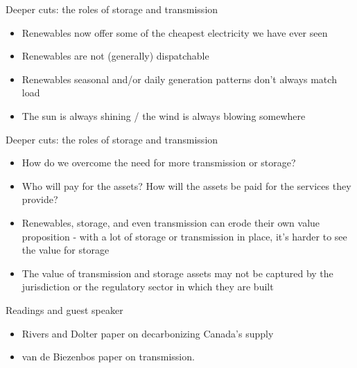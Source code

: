 \documentclass{beamer}
\renewcommand{\(}{\begin{columns}}
\renewcommand{\)}{\end{columns}}
\newcommand{\<}[1]{\begin{column}{#1}}
\renewcommand{\>}{\end{column}}
\begin{document}
\begin{frame}{Deeper cuts: the roles of storage and transmission}
\begin{itemize}
\setlength\itemsep{2em}
\item Renewables now offer some of the cheapest electricity we have ever seen
\item Renewables are not (generally) dispatchable
\item Renewables seasonal and/or daily generation patterns don't always match load
\item The sun is always shining / the wind is always blowing somewhere
\end{itemize}

\vfill \end{frame}



\begin{frame}{Deeper cuts: the roles of storage and transmission}
\begin{itemize}
\setlength\itemsep{2em}
\item How do we overcome the need for more transmission or storage?
\item Who will pay for the assets? How will the assets be paid for the services they provide?
\item Renewables, storage, and even transmission can erode their own value proposition - with a lot of storage or transmission in place, it's harder to see the value for storage
\item The value of transmission and storage assets may not be captured by the jurisdiction or the regulatory sector in which they are built

\end{itemize}

\vfill \end{frame}



\begin{frame}{Readings and guest speaker}
\begin{itemize}
\setlength\itemsep{2em}
\item Rivers and Dolter paper on decarbonizing Canada's supply
\item van de Biezenbos paper on transmission.

\end{itemize}

\vfill \end{frame}
\end{document}

